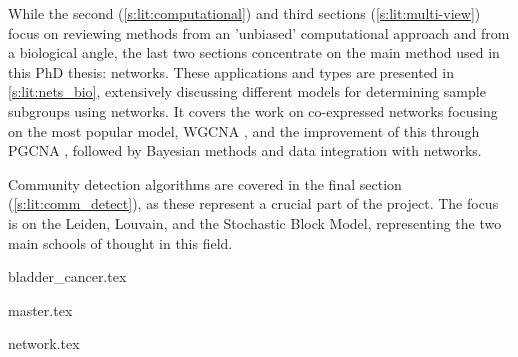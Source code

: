 While the second (\cref{s:lit:computational}) and third sections (\cref{s:lit:multi-view}) focus on reviewing methods from an 'unbiased' computational approach and from a biological angle, the last two sections concentrate on the main method used in this PhD thesis: networks. These applications and types are presented in \cref{s:lit:nets_bio}, extensively discussing different models for determining sample subgroups using networks. It covers the work on co-expressed networks focusing on the most popular model, WGCNA \cite{Langfelder2008-sn}, and the improvement of this through PGCNA \cite{Care2019-ij}, followed by Bayesian methods and data integration with networks.

Community detection algorithms are covered in the final section (\cref{s:lit:comm_detect}), as these represent a crucial part of the project. The focus is on the Leiden, Louvain, and the Stochastic Block Model, representing the two main schools of thought in this field.


{bladder_cancer.tex}

\pagebreak

{master.tex}

\pagebreak

{network.tex}



